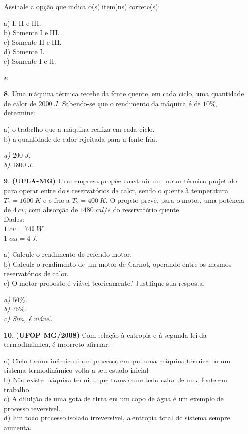 \documentclass[12pt]{article}
\newenvironment{resposta*}
{\bf Resposta:\\ }
{}
\begin{document}
Assinale a opção que indica o(s) item(ns) correto(s):


a) I, II e III. \\
b) Somente I e III. \\
c) Somente II e III. \\
d) Somente I. \\
e) Somente I e II.


\begin{resposta*}
{\it \textbf{e}}
\end{resposta*}

\textbf{8}. Uma máquina térmica recebe da fonte quente, em cada ciclo, uma quantidade de calor de $2000\;J$. Sabendo-se que o rendimento da máquina é de $10\%$, determine:


a) o trabalho que a máquina realiza em cada ciclo. \\
b) a quantidade de calor rejeitada para a fonte fria.


\begin{resposta*}
{\it a) $200\;J$. \\
b) $1800\;J$.}
\end{resposta*}

\textbf{9}. \textbf{(UFLA-MG)} Uma empresa propõe construir um motor térmico projetado para operar entre dois reservatórios de calor, sendo o quente à temperatura $T_{1} = 1600\;K$ e o frio a $T_{2} = 400\;K$. O projeto prevê, para o motor, uma potência de $4\;cv$, com absorção de $1480\;cal/s$ do reservatório quente. \\
Dados: \\
$1\;cv = 740\;W$. \\
$1\;cal = 4\;J$.


a) Calcule o rendimento do referido motor. \\
b) Calcule o rendimento de um motor de Carnot, operando entre os mesmos reservatórios de calor. \\
c) O motor proposto é viável teoricamente? Justifique sua resposta.


\begin{resposta*}
{\it a) $50\%$. \\
b) $75\%$. \\
c) Sim, é viável.}
\end{resposta*}

\textbf{10}. \textbf{(UFOP MG/2008)} Com relação à entropia e à segunda lei da termodinâmica, é incorreto afirmar:


a)	Ciclo termodinâmico é um processo em que uma máquina térmica ou um sistema termodinâmico volta a seu estado inicial. \\
b)	Não existe máquina térmica que transforme todo calor de uma fonte em trabalho. \\
c)	A diluição de uma gota de tinta em um copo de água é um exemplo de processo reversível. \\
d)	Em todo processo isolado irreversível, a entropia total do sistema sempre aumenta.
\end{document}
